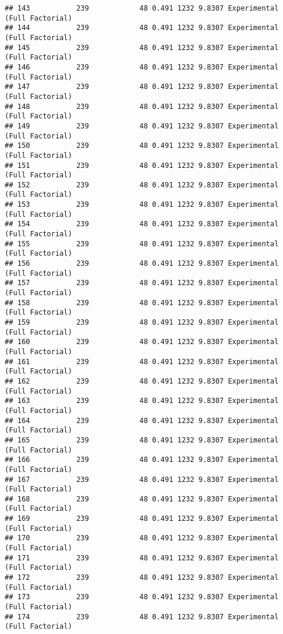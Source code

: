 \documentclass[]{article}
\begin{document}
\begin{verbatim}
## 143           239            48 0.491 1232 9.8307 Experimental (Full Factorial)
## 144           239            48 0.491 1232 9.8307 Experimental (Full Factorial)
## 145           239            48 0.491 1232 9.8307 Experimental (Full Factorial)
## 146           239            48 0.491 1232 9.8307 Experimental (Full Factorial)
## 147           239            48 0.491 1232 9.8307 Experimental (Full Factorial)
## 148           239            48 0.491 1232 9.8307 Experimental (Full Factorial)
## 149           239            48 0.491 1232 9.8307 Experimental (Full Factorial)
## 150           239            48 0.491 1232 9.8307 Experimental (Full Factorial)
## 151           239            48 0.491 1232 9.8307 Experimental (Full Factorial)
## 152           239            48 0.491 1232 9.8307 Experimental (Full Factorial)
## 153           239            48 0.491 1232 9.8307 Experimental (Full Factorial)
## 154           239            48 0.491 1232 9.8307 Experimental (Full Factorial)
## 155           239            48 0.491 1232 9.8307 Experimental (Full Factorial)
## 156           239            48 0.491 1232 9.8307 Experimental (Full Factorial)
## 157           239            48 0.491 1232 9.8307 Experimental (Full Factorial)
## 158           239            48 0.491 1232 9.8307 Experimental (Full Factorial)
## 159           239            48 0.491 1232 9.8307 Experimental (Full Factorial)
## 160           239            48 0.491 1232 9.8307 Experimental (Full Factorial)
## 161           239            48 0.491 1232 9.8307 Experimental (Full Factorial)
## 162           239            48 0.491 1232 9.8307 Experimental (Full Factorial)
## 163           239            48 0.491 1232 9.8307 Experimental (Full Factorial)
## 164           239            48 0.491 1232 9.8307 Experimental (Full Factorial)
## 165           239            48 0.491 1232 9.8307 Experimental (Full Factorial)
## 166           239            48 0.491 1232 9.8307 Experimental (Full Factorial)
## 167           239            48 0.491 1232 9.8307 Experimental (Full Factorial)
## 168           239            48 0.491 1232 9.8307 Experimental (Full Factorial)
## 169           239            48 0.491 1232 9.8307 Experimental (Full Factorial)
## 170           239            48 0.491 1232 9.8307 Experimental (Full Factorial)
## 171           239            48 0.491 1232 9.8307 Experimental (Full Factorial)
## 172           239            48 0.491 1232 9.8307 Experimental (Full Factorial)
## 173           239            48 0.491 1232 9.8307 Experimental (Full Factorial)
## 174           239            48 0.491 1232 9.8307 Experimental (Full Factorial)

\end{verbatim}
\end{document}
